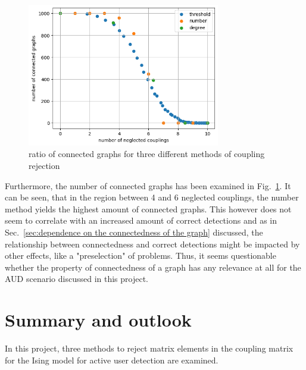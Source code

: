 \documentclass{article}
\begin{document}
\begin{figure}[h]
	\centering
	\includegraphics[width=0.75\textwidth]{img/method_comparison_connected_ratio.png}
	\caption{ratio of connected graphs for three different methods of coupling rejection}
	\label{fig:method comparison connected ratio}
\end{figure}
Furthermore, the number of connected graphs has been examined in Fig.~\ref{fig:method comparison connected ratio}. It can be seen, that in the region between 4 and 6 neglected couplings, the number method yields the highest amount of connected graphs. This however does not seem to correlate with an increased amount of correct detections and as in Sec.~\ref{sec:dependence on the connectedness of the graph} discussed, the relationship between connectedness and correct detections might be impacted by other effects, like a "preselection" of problems. Thus, it seems questionable whether the property of connectedness of a graph has any relevance at all for the AUD scenario discussed in this project. 


\section{Summary and outlook}\label{sec:summary and outlook}
In this project, three methods to reject matrix elements in the coupling matrix for the Ising model for active user detection are examined. 
\end{document}
